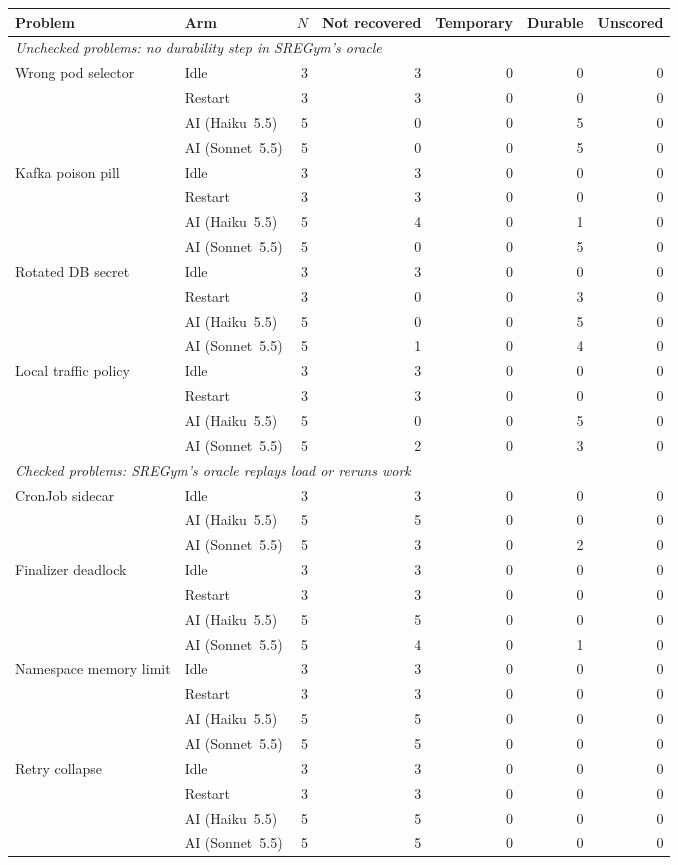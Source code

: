 \begin{tabular}{llrrrrr}
\toprule
Problem & Arm & $N$ & Not recovered & Temporary & Durable & Unscored \\
\midrule
\multicolumn{7}{l}{\emph{Unchecked problems: no durability step in SREGym's oracle}} \\
Wrong pod selector & Idle & 3 & 3 & 0 & 0 & 0 \\
 & Restart & 3 & 3 & 0 & 0 & 0 \\
 & AI (Haiku~5.5) & 5 & 0 & 0 & 5 & 0 \\
 & AI (Sonnet~5.5) & 5 & 0 & 0 & 5 & 0 \\
Kafka poison pill & Idle & 3 & 3 & 0 & 0 & 0 \\
 & Restart & 3 & 3 & 0 & 0 & 0 \\
 & AI (Haiku~5.5) & 5 & 4 & 0 & 1 & 0 \\
 & AI (Sonnet~5.5) & 5 & 0 & 0 & 5 & 0 \\
Rotated DB secret & Idle & 3 & 3 & 0 & 0 & 0 \\
 & Restart & 3 & 0 & 0 & 3 & 0 \\
 & AI (Haiku~5.5) & 5 & 0 & 0 & 5 & 0 \\
 & AI (Sonnet~5.5) & 5 & 1 & 0 & 4 & 0 \\
Local traffic policy & Idle & 3 & 3 & 0 & 0 & 0 \\
 & Restart & 3 & 3 & 0 & 0 & 0 \\
 & AI (Haiku~5.5) & 5 & 0 & 0 & 5 & 0 \\
 & AI (Sonnet~5.5) & 5 & 2 & 0 & 3 & 0 \\
\midrule
\multicolumn{7}{l}{\emph{Checked problems: SREGym's oracle replays load or reruns work}} \\
CronJob sidecar & Idle & 3 & 3 & 0 & 0 & 0 \\
 & AI (Haiku~5.5) & 5 & 5 & 0 & 0 & 0 \\
 & AI (Sonnet~5.5) & 5 & 3 & 0 & 2 & 0 \\
Finalizer deadlock & Idle & 3 & 3 & 0 & 0 & 0 \\
 & Restart & 3 & 3 & 0 & 0 & 0 \\
 & AI (Haiku~5.5) & 5 & 5 & 0 & 0 & 0 \\
 & AI (Sonnet~5.5) & 5 & 4 & 0 & 1 & 0 \\
Namespace memory limit & Idle & 3 & 3 & 0 & 0 & 0 \\
 & Restart & 3 & 3 & 0 & 0 & 0 \\
 & AI (Haiku~5.5) & 5 & 5 & 0 & 0 & 0 \\
 & AI (Sonnet~5.5) & 5 & 5 & 0 & 0 & 0 \\
Retry collapse & Idle & 3 & 3 & 0 & 0 & 0 \\
 & Restart & 3 & 3 & 0 & 0 & 0 \\
 & AI (Haiku~5.5) & 5 & 5 & 0 & 0 & 0 \\
 & AI (Sonnet~5.5) & 5 & 5 & 0 & 0 & 0 \\
\bottomrule
\end{tabular}
